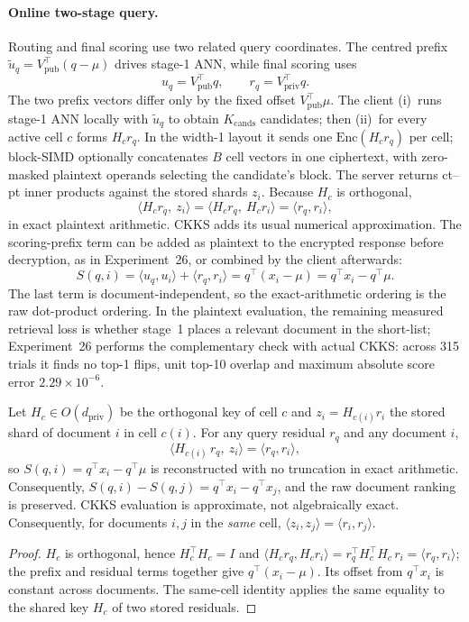 \paragraph{Online two-stage query.} Routing and final scoring use two related
query coordinates. The centred prefix
$\widetilde u_q=V_{\mathrm{pub}}^\top(q-\mu)$ drives stage-1 ANN, while final
scoring uses
\[
u_q=V_{\mathrm{pub}}^\top q,\qquad
r_q=V_{\mathrm{priv}}^\top q.
\]
The two prefix vectors differ only by the fixed offset
$V_{\mathrm{pub}}^\top\mu$. The client (i)~runs stage-1 ANN locally with
$\widetilde u_q$ to obtain $K_{\mathrm{cands}}$ candidates; then (ii)~for
every active cell $c$ forms $H_c r_q$. In the width-1 layout it sends one
$\mathrm{Enc}(H_c r_q)$ per cell; block-SIMD optionally concatenates $B$
cell vectors in one ciphertext, with zero-masked plaintext operands selecting
the candidate's block. The server returns ct--pt inner products against the
stored shards $z_i$. Because $H_c$
is orthogonal,
\[
\langle H_c r_q,\ z_i\rangle=\langle H_c r_q,\ H_c r_i\rangle=\langle r_q, r_i\rangle ,
\]
in exact plaintext arithmetic. CKKS adds its usual numerical approximation.
The scoring-prefix term can be added as plaintext to the encrypted response
before decryption, as in Experiment~26, or combined by the client afterwards:
\[
S(q,i)=\langle u_q,u_i\rangle+\langle r_q,r_i\rangle
=q^\top(x_i-\mu)=q^\top x_i-q^\top\mu .
\]
The last term is document-independent, so the exact-arithmetic ordering is the
raw dot-product ordering. In the plaintext evaluation, the remaining measured
retrieval loss is whether stage~1 places a relevant document in the short-list;
Experiment~26 performs the complementary check with actual CKKS: across 315
trials it finds no top-1 flips, unit top-10 overlap and maximum absolute score
error $2.29\times10^{-6}$.

\begin{proposition}\label{prop:exact}
Let $H_c\in O(d_{\mathrm{priv}})$ be the orthogonal key of cell $c$ and
$z_i=H_{c(i)}r_i$ the stored shard of document $i$ in cell $c(i)$. For any
query residual $r_q$ and any document $i$,
\[
\big\langle H_{c(i)}\,r_q,\ z_i\big\rangle=\langle r_q,r_i\rangle ,
\]
so $S(q,i)=q^\top x_i-q^\top\mu$ is reconstructed with no truncation in
exact arithmetic. Consequently,
$S(q,i)-S(q,j)=q^\top x_i-q^\top x_j$, and the raw document ranking is
preserved. CKKS evaluation is approximate, not algebraically exact.
Consequently, for documents $i,j$ in the \emph{same} cell,
$\langle z_i,z_j\rangle=\langle r_i,r_j\rangle$.
\end{proposition}
\begin{proof}
$H_c$ is orthogonal, hence $H_c^\top H_c=I$ and
$\langle H_c r_q,H_c r_i\rangle=r_q^\top H_c^\top H_c\,r_i=\langle r_q,r_i\rangle$;
the prefix and residual terms together give $q^\top(x_i-\mu)$. Its offset
from $q^\top x_i$ is constant across documents. The same-cell identity
applies the same equality to the shared key $H_c$ of two stored residuals.
\end{proof}

